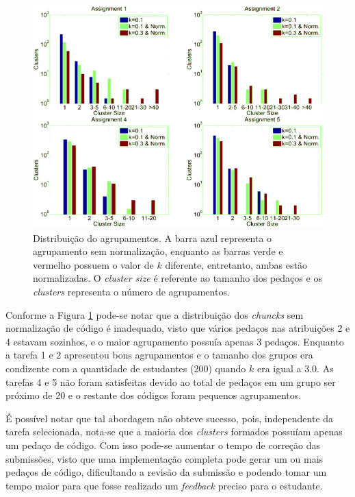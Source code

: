 	\begin{figure}
		\centering
		\includegraphics[width=0.7\linewidth]{imagem/clusteringPerformance}
		\caption{Distribuição do agrupamentos. A barra azul representa o agrupamento
			sem normalização, enquanto as barras verde e vermelho possuem o valor
			de $k$ diferente, entretanto, ambas estão normalizadas. O
			\textit{cluster size} é referente ao tamanho dos pedaços e os
			\textit{clusters} representa o número de agrupamentos.}
		\label{fig:clusteringPerformance}
	\end{figure}
    
	Conforme a Figura \ref{fig:clusteringPerformance} pode-se notar que a
	distribuição dos \textit{chuncks} sem normalização de código é inadequado,
	visto que vários pedaços nas atribuições 2 e 4 estavam sozinhos, e o maior
	agrupamento possuía apenas 3 pedaços. Enquanto a tarefa 1 e 2 apresentou
	bons agrupamentos e o tamanho dos grupos era condizente com a quantidade de
	estudantes (200) quando $k$ era igual a 3.0. As tarefas 4 e 5 não foram
	satisfeitas devido ao total de pedaços em um grupo ser próximo de 20 e o
	restante dos códigos foram pequenos agrupamentos.
	
	É possível notar que tal abordagem não obteve sucesso, pois, independente da
	tarefa selecionada, nota-se que a maioria dos \textit{clusters} formados
	possuíam apenas um pedaço de código. Com isso pode-se aumentar o tempo de
	correção das submissões, visto que uma implementação completa pode gerar um
	ou mais pedaços de código, dificultando a revisão da submissão e podendo tomar
	um tempo maior para que fosse realizado um \textit{feedback} preciso para o
	estudante.